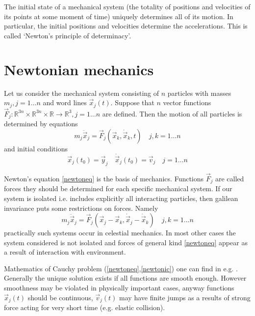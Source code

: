 The initial state of a mechanical system (the totality of positions and
velocities of its points at some moment of time) uniquely determines all of
its motion. In particular, the initial positions and velocities determine the accelerations.
This is called `Newton's principle of determinacy'.

\section{Newtonian mechanics}
\label{cm:nm}

Let us consider the mechanical system consisting of $n$ particles 
with masses $m_j,j=1\ldots n$ and word lines $\vec x_j(t)$.
Suppose that $n$ vector functions  
$\vec F_j:\mathbb{R}^{3 n}\times\mathbb{R}^{3 n}\times\mathbb{R}\rightarrow\mathbb{R}^3,j=1\ldots n$ 
are defined. Then the motion of all particles is determined by equations
\begin{equation}
  \label {newtoneq}
    m_j \ddot \vec x_j=\vec F_j(\vec x_k,\dot \vec x_k,t) \quad j,k=1\ldots n 
\end{equation}
and initial conditions
\begin{equation}
\label {newtonic}
   \vec x_j(t_0)=\vec y_j\quad\dot \vec x_j(t_0)=\vec v_j  \quad j=1\ldots n \end{equation}

Newton's equation \eqref{newtoneq} is  the basis of mechanics. Functions $\vec F_j$
are called forces they should be determined  for each specific mechanical system. If our system
is isolated i.e. includes explicitly all interacting particles, then galilean invariance puts some restrictions on forces.
Namely 
\begin{equation}
  \label {newtoneq-isolated}
    m_j \ddot \vec x_j=\vec F_j(\vec x_j-\vec x_k,\dot \vec x_j-\dot \vec x_k) \quad j,k=1\ldots n 
\end{equation}
practically such systems occur in celestial mechanics. In most other cases the system 
considered is not isolated and forces of general kind \eqref{newtoneq} appear as a result 
of interaction with environment.

Mathematics of  Cauchy problem (\ref{newtoneq},\ref{newtonic}) 
one can find in e.g. \cite{Arnold-ode}. Generally the unique solution exists if
all functions are smooth enough. However smoothness may be violated in physically
important cases, anyway functions $\vec x_j(t)$ should be continuous, $\vec v_j(t)$  may
have finite jumps as a results of strong force acting for very short time (e.g. 
elastic collision).

